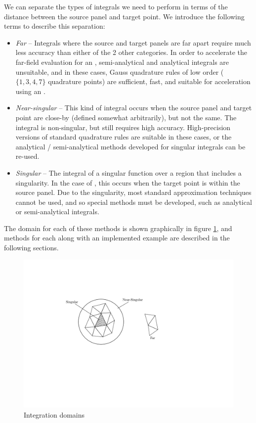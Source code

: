 We can separate the types of integrals we need to perform in terms of the distance between the source panel and target point. We introduce the following terms to describe this separation:

\begin{itemize}

\item \emph{Far} -- Integrals where the source and target panels are far apart require much less accuracy than either of the 2 other categories. In order to accelerate the far-field evaluation for an {\fmm}, semi-analytical and analytical integrals are unsuitable, and in these cases, Gauss quadrature rules of low order ($\{1, 3, 4, 7\}$ quadrature points) are sufficient, fast, and suitable for acceleration using an {\fmm}.

\item \emph{Near-singular} -- This kind of integral occurs when the source panel and target point are close-by (defined somewhat arbitrarily), but not the same. The integral is non-singular, but still requires high accuracy.  High-precision versions of standard quadrature rules are suitable in these cases, or the analytical / semi-analytical methods developed for singular integrals can be re-used.

\item \emph{Singular} -- The integral of a singular function over a region that includes a singularity. In the case of {\bem}, this occurs when the target point is within the source panel. Due to the singularity, most standard approximation techniques cannot be used, and so special methods must be developed, such as analytical or semi-analytical integrals.
	
\end{itemize}

The domain for each of these methods is shown graphically in figure \ref{fig:integration_domain}, and methods for each along with an implemented example are described in the following sections.

\begin{figure}[h]
	\begin{centering}
	\includegraphics[width=12cm]{img/IntegrationDomain.pdf}
	\caption{Integration domains}
	\label{fig:integration_domain}
	\end{centering}
\end{figure}


